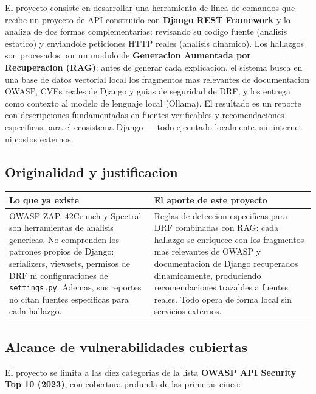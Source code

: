 \documentclass[12pt, a4paper]{article}
\begin{document}
\begin{infobox}
El proyecto consiste en desarrollar una herramienta de linea de comandos que recibe un proyecto de API construido con \textbf{Django REST Framework} y lo analiza de dos formas complementarias: revisando su codigo fuente (analisis estatico) y enviandole peticiones HTTP reales (analisis dinamico). Los hallazgos son procesados por un modulo de \textbf{Generacion Aumentada por Recuperacion (RAG)}: antes de generar cada explicacion, el sistema busca en una base de datos vectorial local los fragmentos mas relevantes de documentacion OWASP, CVEs reales de Django y guias de seguridad de DRF, y los entrega como contexto al modelo de lenguaje local (Ollama). El resultado es un reporte con descripciones fundamentadas en fuentes verificables y recomendaciones especificas para el ecosistema Django --- todo ejecutado localmente, sin internet ni costos externos.
\end{infobox}

\subsection{Originalidad y justificacion}

\begin{center}
\begin{tabularx}{\linewidth}{XX}
\toprule
\textbf{Lo que ya existe} & \textbf{El aporte de este proyecto} \\
\midrule
OWASP ZAP, 42Crunch y Spectral son herramientas de analisis genericas. No comprenden los patrones propios de Django: serializers, viewsets, permisos de DRF ni configuraciones de \texttt{settings.py}. Ademas, sus reportes no citan fuentes especificas para cada hallazgo. &
Reglas de deteccion especificas para DRF combinadas con RAG: cada hallazgo se enriquece con los fragmentos mas relevantes de OWASP y documentacion de Django recuperados dinamicamente, produciendo recomendaciones trazables a fuentes reales. Todo opera de forma local sin servicios externos. \\
\bottomrule
\end{tabularx}
\end{center}

\subsection{Alcance de vulnerabilidades cubiertas}

El proyecto se limita a las diez categorias de la lista \textbf{OWASP API Security Top 10 (2023)}, con cobertura profunda de las primeras cinco:
\end{document}

